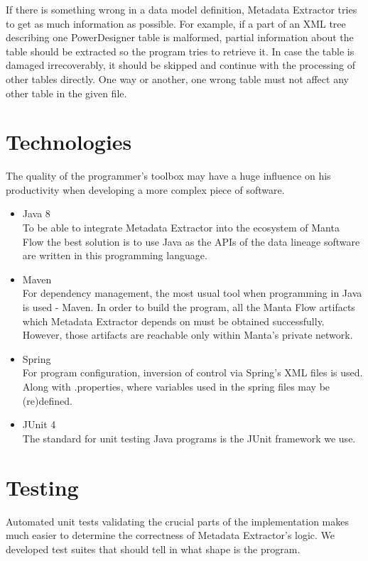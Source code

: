 If there is something wrong in a data model definition, Metadata Extractor tries to get as much information as possible.
For example, if a part of an XML tree describing one PowerDesigner table is malformed, partial information about the table should be extracted so the program tries to retrieve it. In case the table is damaged irrecoverably, it should be skipped and continue with the processing of other tables directly. 
One way or another, one wrong table must not affect any other table in the given file.

\section{Technologies}

The quality of the programmer's toolbox may have a huge influence on his productivity when developing a more complex piece of software.

\begin{itemize}
	\item Java 8 \\
	To be able to integrate Metadata Extractor into the ecosystem of Manta Flow the best solution is to use Java as the APIs of the data lineage software are written in this programming language.
	\item Maven \\ 
	For dependency management, the most usual tool when programming in Java is used - Maven. In order to build the program, all the Manta Flow artifacts which Metadata Extractor depends on must be obtained successfully. However, those artifacts are reachable only within Manta's private network.
	\item Spring \\
	For program configuration, inversion of control via Spring's XML files is used. Along with .properties, where variables used in the spring files may be (re)defined.
	\item JUnit 4 \\ 
	The standard for unit testing Java programs is the JUnit framework we use.
\end{itemize}

\section{Testing}

Automated unit tests validating the crucial parts of the implementation makes much easier to determine the correctness of Metadata Extractor's logic. 
We developed test suites that should tell in what shape is the program.

